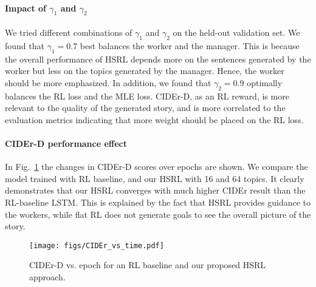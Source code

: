 \documentclass[letterpaper]{article} \usepackage{aaai19}  \usepackage{times}  \usepackage{helvet}  \usepackage{courier}  \usepackage{url}  \usepackage{graphicx}
\begin{document}
\clearpage
{}



\paragraph{Impact of $\gamma_1$ and $\gamma_2$} We tried different combinations of $\gamma_1$ and $\gamma_2$ on  the held-out validation set. We found that $\gamma_1=0.7$ best balances the worker and the manager. This is because the overall performance of HSRL depends more on the sentences generated by the worker but less on the topics generated by the manager. Hence, the worker should be more emphasized.  In addition, we found that $\gamma_2=0.9$ optimally balances the RL loss and the MLE loss. CIDEr-D, as an RL reward, is more relevant to the quality of the generated story, and is more correlated to the evaluation metrics indicating that more weight should be placed on the RL loss. 

\paragraph{CIDEr-D performance effect} 
In Fig.~\ref{fig:CIDEr} the changes in CIDEr-D scores over epochs are shown. We compare the model trained with RL baseline, and our HSRL with 16 and 64 topics. It clearly demonstrates that our HSRL converges with much higher CIDEr result than the RL-baseline LSTM. 
This is explained by the fact that HSRL provides guidance to the workers, while flat RL does not generate goals to see the overall picture of the story.

\begin{figure}[h]
	\centering
	\texttt{[image: figs/CIDEr\_vs\_time.pdf]}
	\caption{CIDEr-D vs. epoch for an RL baseline and our proposed HSRL approach. \small
	}
	\label{fig:CIDEr}
\end{figure}
\end{document}
